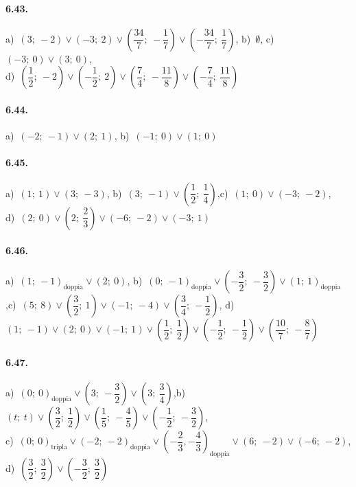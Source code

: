 \paragraph{6.43.} 
a)~\((3;~-2)\vee(-3;~2)\vee\left(\dfrac{34} 7;~-\dfrac 1 7\right) 
\vee \left(-\dfrac{34} 7;~\dfrac 1 7\right)\),\quad 
b)~\(\emptyset\),\quad 
c)~\((-3;~0)\vee(3;~0)\),\protect\\ \quad 
d)~\(\left(\dfrac 1 2;~-2\right)\vee\left(-\dfrac 1 
2;~2\right) \vee \left(\dfrac 
7 4;~-\dfrac{11} 8\right)\vee\left(-\dfrac 7 4;~\dfrac{11} 8\right)\)

\paragraph{6.44.} 
a)~\((-2;~-1)\vee(2;~1)\),\quad 
b)~\((-1;~0)\vee(1;~0)\)

\paragraph{6.45.} 
a)~\((1;~1)\vee(3;~-3)\),\quad 
b)~\((3;~-1)\vee\left(\dfrac 
1 2;~\dfrac 
1 4\right)\),\quad c)~\((1;~0)\vee(-3;~-2)\),\protect\\
\quad d)~\((2;~0)\vee\left(2;~\dfrac 2 3\right)\vee(-6;~-2)\vee(-3;~1)\)

\paragraph{6.46.} a)~\((1;~-1)_\text{doppia} \vee(2;~0)\),\quad 
b)~\((0;~-1)_\text{doppia}\vee\left(-\dfrac 3 2;~-\dfrac 3 
2\right)\vee(1;~1)_\text{doppia}\),\quad c)~\((5;~8)\vee\left(\dfrac 3 
2;~1\right)\vee(-1;~-4)\vee\left(\dfrac 3 4;~-\dfrac 1 2\right)\),\quad 
d)~\((1;~-1)\vee(2;~0)\vee(-1;~1)\vee\left(\dfrac 1 2;~\dfrac 1 
2\right)\vee\left(-\dfrac 1 2;~-\dfrac 1 2\right)\vee\left(\dfrac{10} 
7;~-\dfrac 8 
7\right)\)

\paragraph{6.47.}a)~\((0;~0)_\text{doppia}\vee\left(3;~-\dfrac 3 
2\right)\vee(3;~\dfrac 3 4)\),\quad b)~\((t;~t)\vee\left(\dfrac 3 
2;~\dfrac 
1 
2\right)\vee\left(\dfrac 1 5;~-\dfrac 4 5\right)\vee\left(-\dfrac 1 
2;~-\dfrac 3 
2\right)\),\protect\\
\quad 
c)~\((0;~0)_\text{tripla}\vee(-2;~-2)_\text{doppia}\vee\left(-\dfrac 
2 
3,-\dfrac 4 3\right)_\text{doppia}\vee(6;~-2)\vee(-6;~-2)\),\quad 
d)~\(\left(\dfrac 3 
2;~\dfrac 3 2\right)\vee\left(-\dfrac 3 2;~\dfrac 3 2\right)\)

